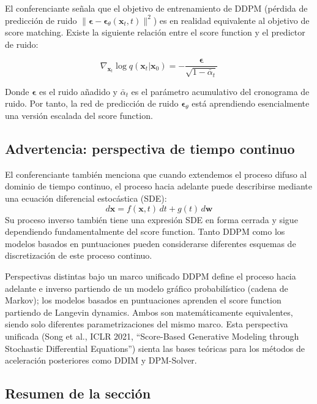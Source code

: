 \documentclass[a4paper]{article}
\begin{document}
El conferenciante señala que el objetivo de entrenamiento de DDPM (pérdida de predicción de ruido $\|\boldsymbol{\epsilon} - \boldsymbol{\epsilon}_\theta(\mathbf{x}_t, t)\|^2$) es en realidad equivalente al objetivo de score matching. Existe la siguiente relación entre el score function y el predictor de ruido:

$$
\nabla_{\mathbf{x}_t} \log q(\mathbf{x}_t | \mathbf{x}_0) = -\frac{\boldsymbol{\epsilon}}{\sqrt{1 - \bar{\alpha}_t}}
$$

Donde $\boldsymbol{\epsilon}$ es el ruido añadido y $\bar{\alpha}_t$ es el parámetro acumulativo del cronograma de ruido. Por tanto, la red de predicción de ruido $\boldsymbol{\epsilon}_\theta$ está aprendiendo esencialmente una versión escalada del score function.

\subsection{Advertencia: perspectiva de tiempo continuo}

El conferenciante también menciona que cuando extendemos el proceso difuso al dominio de tiempo continuo, el proceso hacia adelante puede describirse mediante una ecuación diferencial estocástica (SDE):
$$
d\mathbf{x} = f(\mathbf{x}, t)\,dt + g(t)\,d\mathbf{w}
$$
Su proceso inverso también tiene una expresión SDE en forma cerrada y sigue dependiendo fundamentalmente del score function. Tanto DDPM como los modelos basados en puntuaciones pueden considerarse diferentes esquemas de discretización de este proceso continuo.

\begin{knowledgebox}{Perspectivas distintas bajo un marco unificado}
DDPM define el proceso hacia adelante e inverso partiendo de un modelo gráfico probabilístico (cadena de Markov); los modelos basados en puntuaciones aprenden el score function partiendo de Langevin dynamics. Ambos son matemáticamente equivalentes, siendo solo diferentes parametrizaciones del mismo marco. Esta perspectiva unificada (Song et al., ICLR 2021, ``Score-Based Generative Modeling through Stochastic Differential Equations'') sienta las bases teóricas para los métodos de aceleración posteriores como DDIM y DPM-Solver.
\end{knowledgebox}

\subsection{Resumen de la sección}
\end{document}
